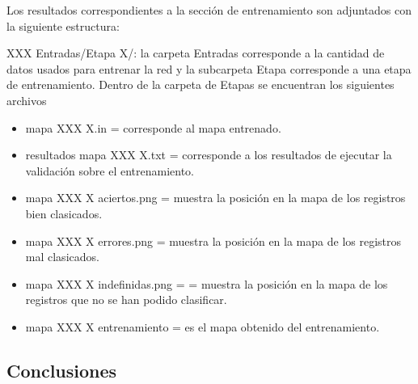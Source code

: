 Los resultados correspondientes a la sección de entrenamiento son adjuntados con 
la siguiente estructura:

XXX Entradas/Etapa X/: la carpeta Entradas corresponde a la cantidad de datos usados para entrenar la red
y la subcarpeta Etapa corresponde a una etapa de entrenamiento. Dentro de la carpeta de
Etapas se encuentran los siguientes archivos

\begin{itemize}
	\item mapa XXX X.in =  corresponde al mapa entrenado.
	\item resultados mapa XXX X.txt = corresponde a los resultados de ejecutar la
validación sobre el entrenamiento.
	\item mapa XXX X aciertos.png = muestra la posición en la mapa de los registros bien clasicados.
	\item mapa XXX X errores.png = muestra la posición en la mapa de los registros mal clasicados.
	\item mapa XXX X indefinidas.png = = muestra la posición en la mapa de los registros que no
se han podido clasificar.
	\item mapa XXX X entrenamiento = es el mapa obtenido del entrenamiento.
\end{itemize}

\subsection{Conclusiones}

